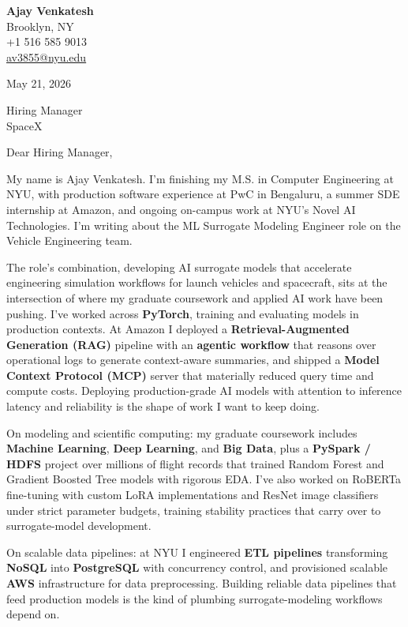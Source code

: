 \documentclass[letterpaper,11pt]{article}
\begin{document}
\begin{flushleft}
\textbf{\large Ajay Venkatesh} \\
Brooklyn, NY \\
+1 516 585 9013 \\
\href{mailto:av3855@nyu.edu}{av3855@nyu.edu}
\end{flushleft}
\vspace{10pt}
May 21, 2026
\vspace{6pt}

Hiring Manager \\
SpaceX

\vspace{10pt}

Dear Hiring Manager,

My name is Ajay Venkatesh. I'm finishing my M.S. in Computer Engineering at NYU, with production software experience at PwC in Bengaluru, a summer SDE internship at Amazon, and ongoing on-campus work at NYU's Novel AI Technologies. I'm writing about the ML Surrogate Modeling Engineer role on the Vehicle Engineering team.

The role's combination, developing AI surrogate models that accelerate engineering simulation workflows for launch vehicles and spacecraft, sits at the intersection of where my graduate coursework and applied AI work have been pushing. I've worked across \textbf{PyTorch}, training and evaluating models in production contexts. At Amazon I deployed a \textbf{Retrieval-Augmented Generation (RAG)} pipeline with an \textbf{agentic workflow} that reasons over operational logs to generate context-aware summaries, and shipped a \textbf{Model Context Protocol (MCP)} server that materially reduced query time and compute costs. Deploying production-grade AI models with attention to inference latency and reliability is the shape of work I want to keep doing.

On modeling and scientific computing: my graduate coursework includes \textbf{Machine Learning}, \textbf{Deep Learning}, and \textbf{Big Data}, plus a \textbf{PySpark / HDFS} project over millions of flight records that trained Random Forest and Gradient Boosted Tree models with rigorous EDA. I've also worked on RoBERTa fine-tuning with custom LoRA implementations and ResNet image classifiers under strict parameter budgets, training stability practices that carry over to surrogate-model development.

On scalable data pipelines: at NYU I engineered \textbf{ETL pipelines} transforming \textbf{NoSQL} into \textbf{PostgreSQL} with concurrency control, and provisioned scalable \textbf{AWS} infrastructure for data preprocessing. Building reliable data pipelines that feed production models is the kind of plumbing surrogate-modeling workflows depend on.
\end{document}
